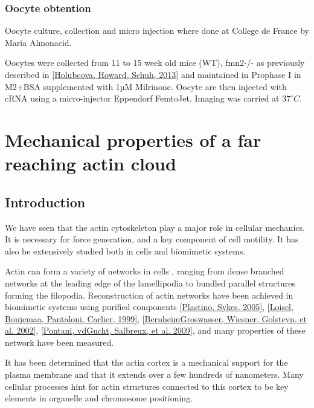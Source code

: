 \documentclass[A4paperpaper,11pt,english]{sphinxmanual}
\begin{document}
\subsection{Oocyte obtention}
\label{parts/part2:oocyte-obtention}
Oocyte culture, collection and micro injection where done at College de France by Maria Almonacid.

Oocytes were collected from 11 to 15 week old mice (WT), fmn2-/- as previously
described in {\hyperref[parts/part2:holubcova2013]{{[}Holubcova, Howard, Schuh,  2013{]}}} and maintained in Prophase I in M2+BSA
supplemented with  1µM Milrinone. Oocyte are then injected with cRNA  using a
micro-injector Eppendorf FemtoJet. Imaging was carried at \(37^\circ{}C\).
\label{parts/part2:oocyte-preparation}

\chapter{Mechanical properties of a far reaching actin cloud}
\label{parts/part3::doc}\label{parts/part3:mechanical-properties-of-a-far-reaching-actin-cloud}

\section{Introduction}
\label{parts/part3:introduction}
We have seen that the actin cytoskeleton play a major role in
cellular mechanics. It is necessary for force generation, and a
key component of cell motility. It has also be extensively studied both in
cells and biomimetic systems.

Actin can form a variety of networks in cells , ranging from dense branched
networks at the leading edge of the lamellipodia to bundled parallel structures
forming the filopodia.  Reconstruction of actin networks have been achieved in
biomimetic systems using purified components {\hyperref[parts/part3:plastino2005]{{[}Plastino, Sykes,  2005{]}}},
{\hyperref[parts/part3:loisel1999]{{[}Loisel, Boujemaa, Pantaloni, Carlier,  1999{]}}}, {\hyperref[parts/part3:bernheim-groswasser2002]{{[}BernheimGroswasser, Wiesner, Golsteyn,  et al.  2002{]}}},  {\hyperref[parts/part3:pontani2009]{{[}Pontani, vdGucht, Salbreux,  et al.  2009{]}}}, and
many properties of these network have been measured.

It has been determined that the actin cortex is  a mechanical support for the
plasma membrane and that it extends over a few hundreds of nanometers. Many
cellular processes hint for actin structures connected to this cortex to be
key elements in organelle and chromosome positioning.
\end{document}
